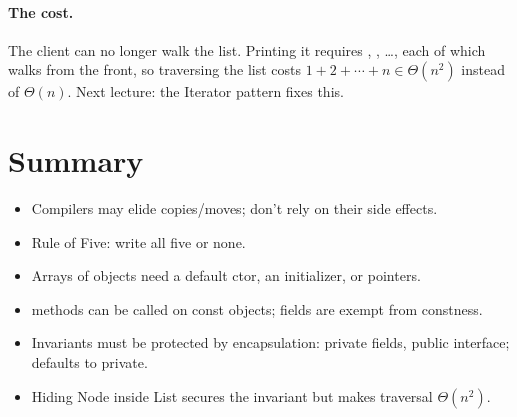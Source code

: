 \paragraph{The cost.} The client can no longer walk the list. Printing it
requires , , \dots, each of which walks from the
front, so traversing the list costs
$1 + 2 + \cdots + n \in \Theta(n^2)$ instead of $\Theta(n)$. Next lecture:
the Iterator pattern fixes this.

\section*{Summary}
\begin{itemize}
  \item Compilers may elide copies/moves; don't rely on their side effects.
  \item Rule of Five: write all five or none.
  \item Arrays of objects need a default ctor, an initializer, or pointers.
  \item {} methods can be called on const objects; 
        fields are exempt from constness.
  \item Invariants must be protected by encapsulation: private fields, public
        interface;  defaults to private.
  \item Hiding Node inside List secures the invariant but makes traversal
        $\Theta(n^2)$.
\end{itemize}
